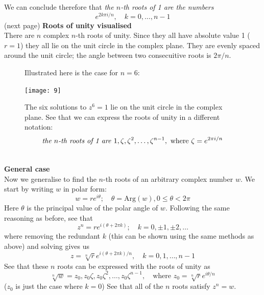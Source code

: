 \documentclass{report}
\begin{document}
We can conclude therefore that \textit{the $n$-th roots of 1 are the numbers}
\begin{equation*}
e^{2k\pi i/n},\quad k=0,\ldots,n-1
\end{equation*}
(next page)
\newpage
\noindent\textbf{Roots of unity visualised}\\
There are $n$ complex $n$-th roots of unity. Since they all have absolute value 1 ($r=1$) they all lie on the unit
circle in the complex plane. They are evenly spaced around the unit circle; the angle between two consecuitive
roots is $2\pi/n$.
\begin{figure}[h]
Illustrated here is the case for $n=6$:
\begin{center}
\texttt{[image: 9]}\\
\end{center}
The six solutions to $z^6=1$ lie on the unit circle in the complex plane. 
See that we can express the roots of unity in
a different notation:
\begin{equation*}
\text{\textit{the $n$-th roots of 1 are} }1,\zeta,\zeta^2,\ldots,\zeta^{n-1},\text{ where }\zeta=e^{2\pi i/n}
\end{equation*}
\end{figure}\\
\textbf{General case}\\
Now we generalise to find the $n$-th roots of an arbitrary complex number $w$. We start by writing $w$ in
polar form:
\begin{equation*}
w=re^{i\theta};\quad\theta=\text{Arg}(w),0\leq\theta<2\pi
\end{equation*}
Here $\theta$ is the principal value of the polar angle of $w$. Following the same reasoning as before, see that
\begin{equation*}
z^n=re^{i(\theta+2\pi k)};\quad k=0,\pm1,\pm2,\ldots
\end{equation*}
where removing the redundant $k$  (this can be shown using the same methods as above) and solving gives us
\begin{equation*}
z=\sqrt[n]{r}e^{i(\theta+2\pi k)/n},\quad k=0,1,\ldots,n-1
\end{equation*}
See that these $n$ roots can be expressed with the roots of unity as
\begin{equation*}
\sqrt[n]{w}=z_0,z_0\zeta,z_0\zeta^2,\ldots,z_0\zeta^{n-1},\quad\text{where }z_0=\sqrt[n]{r}e^{i\theta/n}
\end{equation*}
($z_0$ is just the case where $k=0$) See that all of the $n$ roots satisfy $z^n=w$.
\newpage
\end{document}
